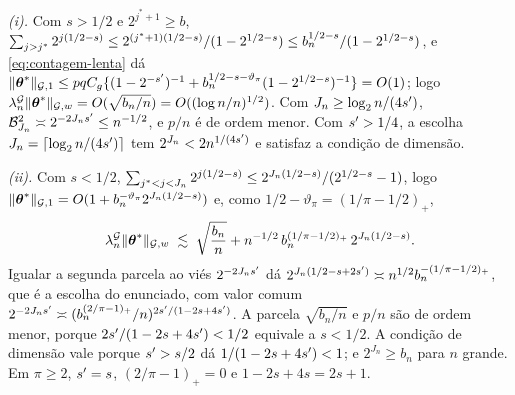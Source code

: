 \documentclass[11pt,a4paper]{article}
\newcommand{\bn}{b_{n}}
\newcommand{\nGw}[1]{\lVert #1\rVert_{\mathcal{G},w}}
\newcommand{\nGone}[1]{\lVert #1\rVert_{\mathcal{G},1}}
\newcommand{\lamG}{\lambda^{\mathcal{G}}_{n}}
\newcommand{\jst}{j^{*}}
\begin{document}
\emph{(i).} Com $s > 1/2$ e $2^{\jst+1} \ge b$,
$\sum_{\lev>\jst}2^{\lev(1/2-s)} \le 2^{(\jst+1)(1/2-s)}/(1 - 2^{1/2-s}) \le
\bn^{1/2-s}/(1 - 2^{1/2-s})$, e \eqref{eq:contagem-lenta} dá
$\nGone{\thetastar} \le pqC_{g}\{(1 - 2^{-\seff})^{-1} +
\bn^{1/2-s-\vartheta_{\pi}}(1 - 2^{1/2-s})^{-1}\} = O(1)$; logo
$\lamG\nGw{\thetastar} = O(\sqrt{\bn/n}) = O((\log n/n)^{1/2})$. Com
$J_{n} \ge \log_{2}n/(4s')$, $\mathcal{B}_{J_{n}}^{2} \asymp
2^{-2J_{n}s'} \le n^{-1/2}$, e $p/n$ é de ordem menor. Com $s' > 1/4$, a
escolha $J_{n} = \lceil\log_{2}n/(4s')\rceil$ tem $2^{J_{n}} <
2n^{1/(4s')}$ e satisfaz a condição de dimensão.

\emph{(ii).} Com $s < 1/2$, $\sum_{\jst<\lev<J_{n}}2^{\lev(1/2-s)} \le
2^{J_{n}(1/2-s)}/(2^{1/2-s} - 1)$, logo $\nGone{\thetastar} =
O(1 + \bn^{-\vartheta_{\pi}}2^{J_{n}(1/2-s)})$ e, como $1/2 - \vartheta_{\pi} =
(1/\pi - 1/2)_{+}$,
\[
  \lamG\nGw{\thetastar} \;\lesssim\; \sqrt{\frac{\bn}{n}}
  + n^{-1/2}\,\bn^{(1/\pi-1/2)_{+}}\,2^{J_{n}(1/2-s)} .
\]
Igualar a segunda parcela ao viés $2^{-2J_{n}s'}$ dá
$2^{J_{n}(1/2-s+2\seff)} \asymp n^{1/2}\bn^{-(1/\pi-1/2)_{+}}$, que é a escolha
do enunciado, com valor comum $2^{-2J_{n}\seff} \asymp
(\bn^{(2/\pi-1)_{+}}/n)^{2\seff/(1-2s+4\seff)}$. A parcela $\sqrt{\bn/n}$ e
$p/n$ são de ordem menor, porque $2s'/(1-2s+4s') < 1/2$ equivale a
$s < 1/2$. A condição de dimensão vale porque $s' > s/2$ dá
$1/(1-2s+4s') < 1$; e $2^{J_{n}} \ge \bn$ para $n$ grande. Em $\pi \ge 2$,
$s' = s$, $(2/\pi-1)_{+} = 0$ e $1 - 2s + 4s = 2s + 1$.
\end{document}
